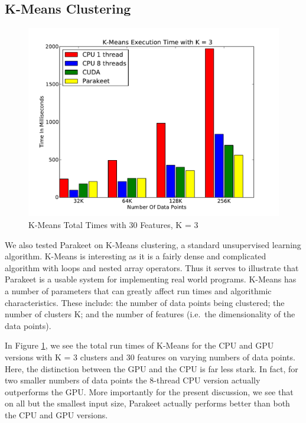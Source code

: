 \documentclass[10pt,twocolumn]{article}
\begin{document}
\subsection{K-Means Clustering}
\label{results-k-means}

\begin{figure}
\includegraphics[scale=0.45]{KMCPUK3.pdf}
\caption{K-Means Total Times with 30 Features, K = 3}
\label{KMCPU3}
\end{figure}

We also tested Parakeet on K-Means clustering, a standard unsupervised learning algorithm.  K-Means is interesting as it is a fairly dense and complicated algorithm with loops and nested array operators.  Thus it serves to illustrate that Parakeet is a usable system for implementing real world programs.  K-Means has a number of parameters that can greatly affect run times and algorithmic characteristics.  These include: the number of data points being clustered; the number of clusters K; and the number of features (i.e.~the dimensionality of the data points).

In Figure \ref{KMCPU3}, we see the total run times of K-Means for the CPU and GPU versions with K = 3 clusters and 30 features on varying numbers of data points.  Here, the distinction between the GPU and the CPU is far less stark.  In fact, for two smaller numbers of data points the 8-thread CPU version actually outperforms the GPU.  More importantly for the present discussion, we see that on all but the smallest input size, Parakeet actually performs better than both the CPU and GPU versions.
\end{document}
